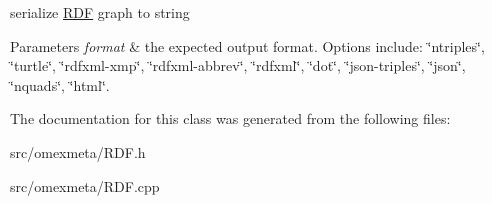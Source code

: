 serialize \hyperlink{classomexmeta_1_1RDF}{R\+DF} graph to string 


\begin{DoxyParams}{Parameters}
{\em format} & the expected output format. Options include\+: \char`\"{}ntriples\char`\"{}, \char`\"{}turtle\char`\"{}, \char`\"{}rdfxml-\/xmp\char`\"{}, \char`\"{}rdfxml-\/abbrev\char`\"{}, \char`\"{}rdfxml\char`\"{}, \char`\"{}dot\char`\"{}, \char`\"{}json-\/triples\char`\"{}, \char`\"{}json\char`\"{}, \char`\"{}nquads\char`\"{}, \char`\"{}html\char`\"{}. \\
\hline
\end{DoxyParams}


The documentation for this class was generated from the following files\+:\begin{DoxyCompactItemize}
\item 
src/omexmeta/R\+D\+F.\+h\item 
src/omexmeta/R\+D\+F.\+cpp\end{DoxyCompactItemize}
